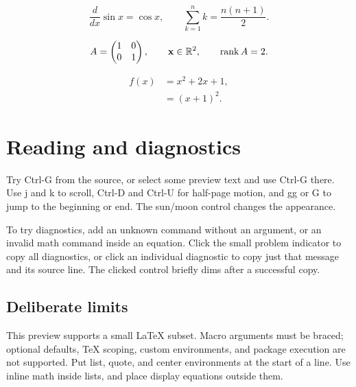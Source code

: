 \[
  \frac{d}{dx}\sin x = \cos x,
  \qquad \sum_{k=1}^{n} k = \frac{n(n+1)}{2}.
\]

\begin{equation*}
  A = \begin{pmatrix}1 & 0\\0 & 1\end{pmatrix},
  \qquad \mathbf{x}\in\mathbb{R}^2,
  \qquad \operatorname{rank} A = 2.
\end{equation*}

\[
  \begin{aligned}
    f(x) &= x^2+2x+1,\\
         &= (x+1)^2.
  \end{aligned}
\]

\section{Reading and diagnostics}
Try Ctrl-G from the source, or select some preview text and use Ctrl-G there.
Use j and k to scroll, Ctrl-D and Ctrl-U for half-page motion, and gg or G to
jump to the beginning or end. The sun/moon control changes the appearance.

To try diagnostics, add an unknown command without an argument, or an invalid
math command inside an equation. Click the small problem indicator to copy all
diagnostics, or click an individual diagnostic to copy just that message and
its source line. The clicked control briefly dims after a successful copy.

\subsection{Deliberate limits}
This preview supports a small LaTeX subset. Macro arguments must be braced;
optional defaults, TeX scoping, custom environments, and package execution are
not supported. Put list, quote, and center environments at the start of a line.
Use inline math inside lists, and place display equations outside them.
